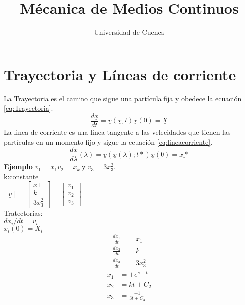 \documentclass[12pt,a4paper]{article}
\title{\textbf{Mécanica de Medios Continuos}}
\author{Universidad de Cuenca}
\begin{document}
\maketitle
\section*{Trayectoria  y Líneas de corriente }
La Trayectoria es el camino que sigue una partícula fija y obedece la ecuación \ref{eq:Trayectoria}.
\begin{equation}
    \frac{d\underline{x}}{dt}=\underline{v}(\underline{x},t) \underline{x}(0)=\underline{X}
    \label{eq:Trayectoria}
\end{equation}
La linea de corriente es una linea tangente a las velocidades que tienen las partículas en un momento fijo y sigue la ecuación \ref{eq:lineacorriente}.
\begin{equation}
    \frac{d\underline{x}}{d\lambda}(\lambda)=\underline{v}(\underline{x}(\lambda);t*) \underline{x}(0)=\underline{x*}
    \label{eq:lineacorriente}
\end{equation}
\textbf{Ejemplo} $v_1=x_1 v_2=x_k$ y $v_3=3x_3^2$.\\
k:constante\\
$[\underline{v}]=\begin{bmatrix}
    x1\\k\\3x_3^2
\end{bmatrix}=\begin{bmatrix}
    v_1\\v_2\\v_3
\end{bmatrix}$\\
Tratectorias:\\
$dx_i/dt=v_i$\\
$x_i(0)=X_i$
\begin{align}
    \frac{dx_1}{dt}&=x_1\\
    \frac{dx_2}{dt}&=k\\
    \frac{dx_3}{dt}&=3x_3^2
\end{align}
\begin{align}
    x_1&=\pm e^{s+t}\\
    x_2&=kt+C_2\\
    x_3&=\frac{-1}{3t+C_3}
\end{align}
\end{document}
